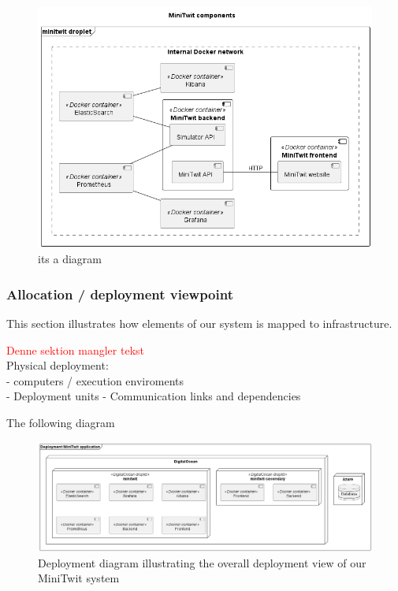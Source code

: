 \begin{figure}[H]
 \centering
 \includegraphics[width = \textwidth]{Images/all_components.png}
 \caption{its a diagram}
 \label{fig:CompleteComponentDiagram}
\end{figure}


\subsubsection{Allocation / deployment viewpoint}
This section illustrates how elements of our system is mapped to infrastructure.


\textcolor{red}{Denne sektion mangler tekst} \\
Physical deployment: \\
- computers / execution enviroments \\
- Deployment units
- Communication links and dependencies

The following diagram
\begin{figure}[H]
 \centering
 \includegraphics[width = \textwidth]{Images/deployment.png}
 \caption{Deployment diagram illustrating the overall deployment view of our MiniTwit system}
 \label{fig:DeploymentDiagram}
\end{figure}

